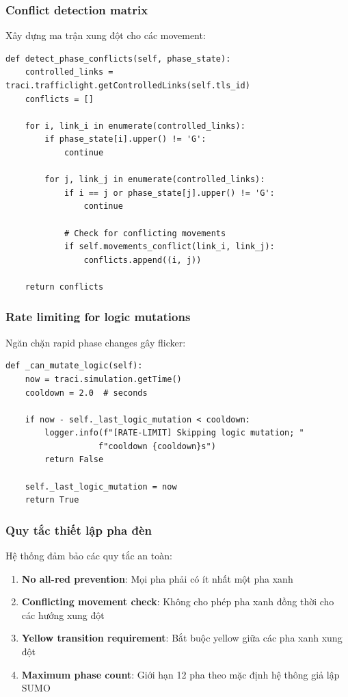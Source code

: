 \subsubsection{Conflict detection matrix}

Xây dựng ma trận xung đột cho các movement:

\begin{lstlisting}[style=py, caption={Phase conflict detection}]
def detect_phase_conflicts(self, phase_state):
    controlled_links = traci.trafficlight.getControlledLinks(self.tls_id)
    conflicts = []
    
    for i, link_i in enumerate(controlled_links):
        if phase_state[i].upper() != 'G':
            continue
            
        for j, link_j in enumerate(controlled_links):
            if i == j or phase_state[j].upper() != 'G':
                continue
                
            # Check for conflicting movements
            if self.movements_conflict(link_i, link_j):
                conflicts.append((i, j))
                
    return conflicts
\end{lstlisting}

\subsubsection{Rate limiting for logic mutations}

Ngăn chặn rapid phase changes gây flicker:

\begin{lstlisting}[style=py, caption={Logic mutation rate limiting}]
def _can_mutate_logic(self):
    now = traci.simulation.getTime()
    cooldown = 2.0  # seconds
    
    if now - self._last_logic_mutation < cooldown:
        logger.info(f"[RATE-LIMIT] Skipping logic mutation; "
                   f"cooldown {cooldown}s")
        return False
        
    self._last_logic_mutation = now
    return True
\end{lstlisting}

\subsubsection{Quy tắc thiết lập pha đèn}

Hệ thống đảm bảo các quy tắc an toàn:

\begin{enumerate}
    \item \textbf{No all-red prevention}: Mọi pha phải có ít nhất một pha xanh
    \item \textbf{Conflicting movement check}: Không cho phép pha xanh đồng thời cho các hướng xung đột
    \item \textbf{Yellow transition requirement}: Bắt buộc yellow giữa các pha xanh xung đột
    \item \textbf{Maximum phase count}: Giới hạn 12 pha theo mặc định hệ thông giả lập SUMO
\end{enumerate}

